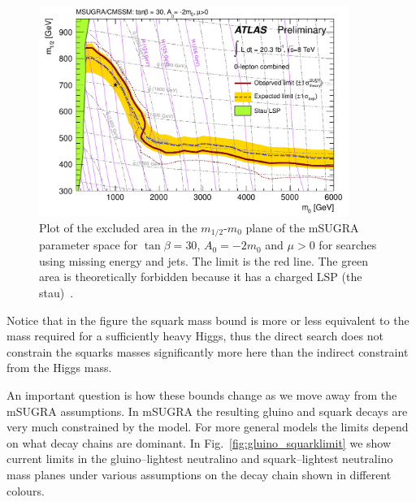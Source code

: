 \documentclass[notes.tex]{subfiles}
\begin{document}
\begin{figure}[t!]
\begin{center}
\includegraphics[width=0.9\textwidth]{figures/mSUGRA_0lep_limit} 
\caption{Plot of the excluded area in the $m_{1/2}$-$m_0$ plane of the mSUGRA parameter space for $\tan\beta=30$, $A_0=-2m_0$ and $\mu >0$ for searches using missing energy and jets. The limit is the red line. The green area is theoretically forbidden because it has a charged LSP (the stau)~\cite{ATLAS-CONF-2013-047}.}
\label{fig:msugra_squarkgluinolimit}
\end{center}
\end{figure}

Notice that in the figure the squark mass bound is more or less equivalent to the mass required for a sufficiently heavy Higgs, thus the direct search does not constrain the squarks masses significantly more here than the indirect constraint from the Higgs mass. 

An important question is how these bounds change as we move away from the mSUGRA assumptions. In mSUGRA the resulting gluino and squark decays are very much constrained by the model. For more general models the limits depend on what decay chains are dominant. In Fig.~\ref{fig:gluino_squarklimit} we show current limits in the gluino--lightest neutralino and squark--lightest neutralino mass planes under various assumptions on the decay chain shown in different colours. 
\end{document}

